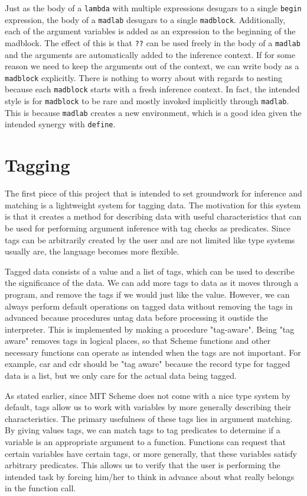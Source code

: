 \documentclass[11pt]{article}
\begin{document}
Just as the body of a \texttt{lambda} with multiple expressions
desugars to a single \texttt{begin} expression,
the body of a \texttt{madlab} desugars to a single \texttt{madblock}.
Additionally, each of the argument variables is added as an expression
to the beginning of the madblock.
The effect of this is that \texttt{??}
can be used freely in the body of a \texttt{madlab}
and the arguments are automatically added to the inference context.
If for some reason we need to keep the arguments out of the context,
we can write body as a \texttt{madblock} explicitly.
There is nothing to worry about with regards to nesting
because each \texttt{madblock} starts with a fresh inference context.
In fact, the intended style is for \texttt{madblock} to be rare
and mostly invoked implicitly through \texttt{madlab}.
This is because \texttt{madlab} creates a new environment,
which is a good idea given the intended synergy with \texttt{define}.


\section{Tagging}

The first piece of this project that is intended to set groundwork
for inference and matching is a lightweight system for tagging data.
The motivation for this system is that it creates a method for
describing data with useful characteristics that can be used for
performing argument inference with tag checks as predicates.
Since tags can be arbitrarily created by the user
and are not limited like type systems usually are,
the language becomes more flexible.

Tagged data consists of a value and a list of tags,
which can be used to describe the significance of the data.
We can add more tags to data as it moves through a program,
and remove the tags if we would just like the value.
However, we can always perform default operations on tagged data
without removing the tags in advanced because procedures
untag data before processing it oustide the interpreter.
This is implemented by making a procedure "tag-aware".
Being "tag aware" removes tags in logical places,
so that Scheme functions and other necessary functions
can operate as intended when the tags are not important.
For example, car and cdr should be "tag aware" because
the record type for tagged data is a list,
but we only care for the actual data being tagged.

As stated earlier, since MIT Scheme does not come
with a nice type system by default,
tags allow us to work with variables
by more generally describing their characteristics.
The primary usefulness of these tags lies in argument matching.
By giving values tags, we can match tags to tag predicates
to determine if a variable is an appropriate argument to a function.
Functions can request that certain variables have certain tags,
or more generally, that these variables satisfy arbitrary predicates.
This allows us to verify that the user is performing the intended task
by forcing him/her to think in advance about what really belongs
in the function call.
\end{document}
